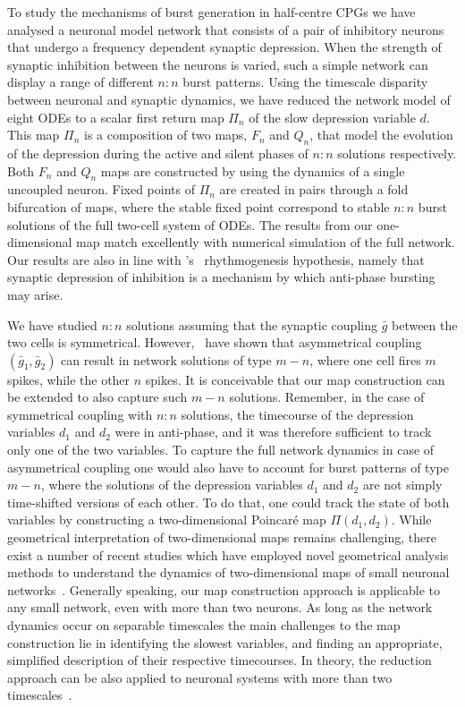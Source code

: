 \documentclass[utf8]{frontiersFPHY} %
\newcommand{\gbar}{\bar g}
\begin{document}
To study the mechanisms of burst generation in half-centre CPGs we have analysed a neuronal model network that consists of a pair of inhibitory neurons that undergo a frequency dependent synaptic depression.
When the strength of synaptic inhibition between the neurons is varied, such a simple network can display a range of different $n:n$ burst patterns.
Using the timescale disparity between neuronal and synaptic dynamics, we have reduced the network model of eight ODEs to a scalar first return map $\Pi_n$ of the slow depression variable $d$.
This map $\Pi_n$ is a composition of two maps, $F_n$ and $Q_n$, that model the evolution of the depression during the active and silent phases of $n:n$ solutions respectively.
Both $F_n$ and $Q_n$ maps are constructed by using the dynamics of a single uncoupled neuron.
Fixed points of $\Pi_n$ are created in pairs through a fold bifurcation of maps, where the stable fixed point correspond to stable $n:n$ burst solutions of the full two-cell system of ODEs.
The results from our one-dimensional map match excellently with numerical simulation of the full network.
Our results are also in line with \citeauthor{brown1911}'s~\citeyear{brown1911} rhythmogenesis hypothesis, namely that synaptic depression of inhibition is a mechanism by which anti-phase bursting may arise.

We have studied $n:n$ solutions assuming that the synaptic coupling $\gbar $ between the two cells is symmetrical.
However,~\citet{bose2011} have shown that asymmetrical coupling $(\gbar_1, \gbar_2)$ can result in network solutions of type $m-n$, where one cell fires $m$ spikes, while the other $n$ spikes.
It is conceivable that our map construction can be extended to also capture such $m-n$ solutions.
Remember, in the case of symmetrical coupling with $n:n$ solutions, the timecourse of the depression variables $d_{1}$ and $d_{2}$ were in anti-phase, and it was therefore sufficient to track only one of the two variables.
To capture the full network dynamics in case of asymmetrical coupling one would also have to account for burst patterns of type $m-n$, where the solutions of the depression variables $d_1$ and $d_2$ are not simply time-shifted versions of each other.
To do that, one could track the state of both variables by constructing a two-dimensional Poincaré map $\Pi(d_1,d_2)$.
While geometrical interpretation of two-dimensional maps remains challenging, there exist a number of recent studies which have employed novel geometrical analysis methods to understand the dynamics of two-dimensional maps of small neuronal networks~\citep{akcay2014,akcay2018,liao2020}.
Generally speaking, our map construction approach is applicable to any small network, even with more than two neurons.
As long as the network dynamics occur on separable timescales the main challenges to the map construction lie in identifying the slowest variables, and finding an appropriate, simplified description of their respective timecourses.
In theory, the reduction approach can be also applied to neuronal systems with more than two timescales~\citep[e.g. see][]{kuehn2015}.
\end{document}
